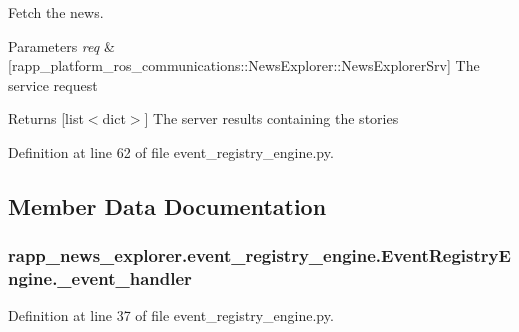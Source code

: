 Fetch the news. 


\begin{DoxyParams}{Parameters}
{\em req} & \mbox{[}rapp\-\_\-platform\-\_\-ros\-\_\-communications\-::\-News\-Explorer\-::\-News\-Explorer\-Srv\mbox{]} The service request\\
\hline
\end{DoxyParams}
\begin{DoxyReturn}{Returns}
\mbox{[}list$<$dict$>$\mbox{]} The server results containing the stories 
\end{DoxyReturn}


Definition at line 62 of file event\-\_\-registry\-\_\-engine.\-py.



\subsection{Member Data Documentation}
\hypertarget{classrapp__news__explorer_1_1event__registry__engine_1_1EventRegistryEngine_ab274c792854dc175b2766d0a17f78b77}{
\subsubsection[{\-\_\-event\-\_\-handler}]{\setlength{\rightskip}{0pt plus 5cm}rapp\-\_\-news\-\_\-explorer.\-event\-\_\-registry\-\_\-engine.\-Event\-Registry\-Engine.\-\_\-event\-\_\-handler\hspace{0.3cm}{\ttfamily [private]}}}\label{classrapp__news__explorer_1_1event__registry__engine_1_1EventRegistryEngine_ab274c792854dc175b2766d0a17f78b77}


Definition at line 37 of file event\-\_\-registry\-\_\-engine.\-py.

